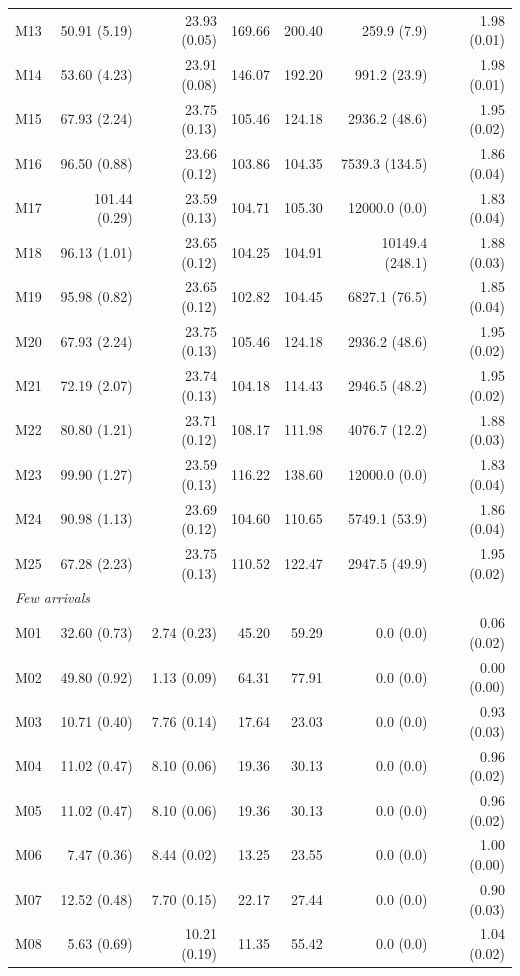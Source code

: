 \documentclass[11pt]{article}
\theoremstyle{remark}
\begin{document}
\begin{longtable}{lrrrrrr}
M13 & 50.91 (5.19) & 23.93 (0.05) & 169.66 & 200.40 & 259.9 (7.9) & 1.98 (0.01) \\
M14 & 53.60 (4.23) & 23.91 (0.08) & 146.07 & 192.20 & 991.2 (23.9) & 1.98 (0.01) \\
M15 & 67.93 (2.24) & 23.75 (0.13) & 105.46 & 124.18 & 2936.2 (48.6) & 1.95 (0.02) \\
M16 & 96.50 (0.88) & 23.66 (0.12) & 103.86 & 104.35 & 7539.3 (134.5) & 1.86 (0.04) \\
M17 & 101.44 (0.29) & 23.59 (0.13) & 104.71 & 105.30 & 12000.0 (0.0) & 1.83 (0.04) \\
M18 & 96.13 (1.01) & 23.65 (0.12) & 104.25 & 104.91 & 10149.4 (248.1) & 1.88 (0.03) \\
M19 & 95.98 (0.82) & 23.65 (0.12) & 102.82 & 104.45 & 6827.1 (76.5) & 1.85 (0.04) \\
M20 & 67.93 (2.24) & 23.75 (0.13) & 105.46 & 124.18 & 2936.2 (48.6) & 1.95 (0.02) \\
M21 & 72.19 (2.07) & 23.74 (0.13) & 104.18 & 114.43 & 2946.5 (48.2) & 1.95 (0.02) \\
M22 & 80.80 (1.21) & 23.71 (0.12) & 108.17 & 111.98 & 4076.7 (12.2) & 1.88 (0.03) \\
M23 & 99.90 (1.27) & 23.59 (0.13) & 116.22 & 138.60 & 12000.0 (0.0) & 1.83 (0.04) \\
M24 & 90.98 (1.13) & 23.69 (0.12) & 104.60 & 110.65 & 5749.1 (53.9) & 1.86 (0.04) \\
M25 & 67.28 (2.23) & 23.75 (0.13) & 110.52 & 122.47 & 2947.5 (49.9) & 1.95 (0.02) \\
\multicolumn{7}{l}{\textit{Few arrivals}} \\
M01 & 32.60 (0.73) & 2.74 (0.23) & 45.20 & 59.29 & 0.0 (0.0) & 0.06 (0.02) \\
M02 & 49.80 (0.92) & 1.13 (0.09) & 64.31 & 77.91 & 0.0 (0.0) & 0.00 (0.00) \\
M03 & 10.71 (0.40) & 7.76 (0.14) & 17.64 & 23.03 & 0.0 (0.0) & 0.93 (0.03) \\
M04 & 11.02 (0.47) & 8.10 (0.06) & 19.36 & 30.13 & 0.0 (0.0) & 0.96 (0.02) \\
M05 & 11.02 (0.47) & 8.10 (0.06) & 19.36 & 30.13 & 0.0 (0.0) & 0.96 (0.02) \\
M06 & 7.47 (0.36) & 8.44 (0.02) & 13.25 & 23.55 & 0.0 (0.0) & 1.00 (0.00) \\
M07 & 12.52 (0.48) & 7.70 (0.15) & 22.17 & 27.44 & 0.0 (0.0) & 0.90 (0.03) \\
M08 & 5.63 (0.69) & 10.21 (0.19) & 11.35 & 55.42 & 0.0 (0.0) & 1.04 (0.02) \\

\end{longtable}
\end{document}
